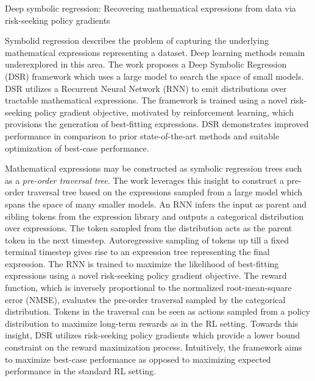 \documentclass[11pt,letterpaper]{article}
\begin{document}
\begin{center}
  \large{Deep symbolic regression: Recovering mathematical expressions from data via risk-seeking policy gradients}
\end{center}

Symbolid regression describes the problem of capturing the underlying mathematical expressions representing a dataset. Deep learning methods remain underexplored in this area. The work proposes a Deep Symbolic Regression (DSR) framework which uses a large model to search the space of small models. DSR utilizes a Recurrent Neural Network (RNN) to emit distributions over tractable mathematical expressions. The framework is trained using a novel risk-seeking policy gradient objective, motivated by reinforcement learning, which provisions the generation of best-fitting expressions. DSR demonstrates improved performance in comparison to prior state-of-the-art methods and suitable optimization of best-case performance. 

Mathematical expressions may be constructed as symbolic regression trees such as a \textit{pre-order traversal tree}. The work leverages this insight to construct a pre-order traversal tree based on the expressions sampled from a large model which spans the space of many smaller models. An RNN infers the input as parent and sibling tokens from the expression library and outputs a categorical distribution over expressions. The token sampled from the distribution acts as the parent token in the next timestep. Autoregressive sampling of tokens up till a fixed terminal timestep gives rise to an expression tree representing the final expression. The RNN is trained to maximize the likelihood of best-fitting expressions using a novel risk-seeking policy gradient objective. The reward function, which is inversely proportional to the normalized root-mean-square error (NMSE), evaluates the pre-order traversal sampled by the categorical distribution. Tokens in the traversal can be seen as actions sampled from a policy distribution to maximize long-term rewards as in the RL setting. Towards this insight, DSR utilizes risk-seeking policy gradients which provide a lower bound constraint on the reward maximization process. Intuitively, the framework aims to maximize best-case performance as opposed to maximizing expected performance in the standard RL setting.
\end{document}

